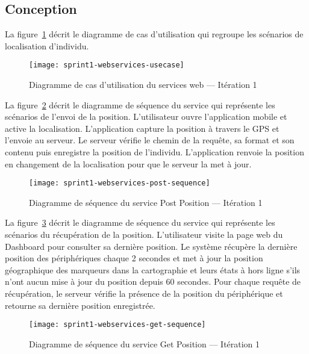 \subsection{Conception}

La figure~\ref{fig:sprint1-webservices-usecase} décrit le diagramme
de cas d'utilisation qui regroupe les scénarios de localisation d'individu.

\begin{figure}[H]
    \centering
    \texttt{[image: sprint1-webservices-usecase]}
    \caption{Diagramme de cas d'utilisation du services web --- Itération 1}
\label{fig:sprint1-webservices-usecase}
\end{figure}

La figure~\ref{fig:sprint1-webservices-post-sequence} décrit le diagramme de
séquence du service  qui représente les scénarios de
l'envoi de la position. L'utilisateur ouvre l'application mobile et active la
localisation. L'application capture la position à travers le GPS et l'envoie au
serveur. Le serveur vérifie le chemin de la requête, sa format et son contenu
puis enregistre la position de l'individu. L'application renvoie la position en
changement de la localisation pour que le serveur la met à jour.

\begin{figure}[H]
    \centering
    \texttt{[image: sprint1-webservices-post-sequence]}
    \caption{Diagramme de séquence du service Post Position --- Itération 1}
\label{fig:sprint1-webservices-post-sequence}
\end{figure}

La figure~\ref{fig:sprint1-webservices-get-sequence} décrit le diagramme de
séquence du service  qui représente les scénarios du
récupération de la position. L'utilisateur visite la page web du Dashboard pour
consulter sa dernière position.  Le système récupère la dernière position des
périphériques chaque 2 secondes et met à jour la position géographique des
marqueurs dans la cartographie et leurs états à hors ligne s'ils n'ont aucun
mise à jour du position depuis 60 secondes. Pour chaque requête de
récupération, le serveur vérifie la présence de la position du périphérique et
retourne sa dernière position enregistrée.

\begin{figure}[H]
    \centering
    \texttt{[image: sprint1-webservices-get-sequence]}
    \caption{Diagramme de séquence du service Get Position --- Itération 1}
\label{fig:sprint1-webservices-get-sequence}
\end{figure}

